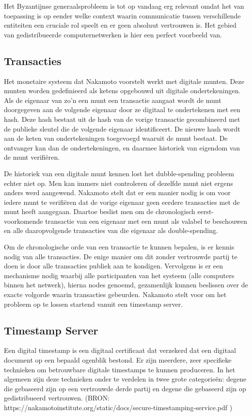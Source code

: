 			Het Byzantijnse generaalsprobleem is tot op vandaag erg relevant omdat het van toepassing is op eender welke context waarin communicatie tussen verschillende entiteiten een cruciale rol speelt en er geen absoluut vertrouwen is. Het gebied van gedistribueerde computernetwerken is hier een perfect voorbeeld van.
			
	\subsection{Transacties}
	Het monetaire systeem dat Nakamoto voorstelt werkt met digitale munten. Deze munten worden gedefinieerd als ketens opgebouwd uit digitale ondertekeningen. Als de eigenaar van zo’n een munt een transactie aangaat wordt de munt doorgegeven aan de volgende eigenaar door ze digitaal te ondertekenen met een hash. Deze hash bestaat uit de hash van de vorige transactie gecombineerd met de publieke sleutel die de volgende eigenaar identificeert. De nieuwe hash wordt aan de keten van ondertekeningen toegevoegd waaruit de munt bestaat. De ontvanger kan dan de ondertekeningen, en daarmee historiek van eigendom van de munt verifiëren. 
			
	De historiek van een digitale munt kennen lost het dubble-spending probleem echter niet op. Men kan immers niet controleren of dezelfde munt niet ergens anders werd aangewend. Nakamoto stelt dat er een manier nodig is om voor iedere munt te verifiëren dat de vorige eigenaar geen eerdere transacties met de munt heeft aangegaan. Daartoe beslist men om de chronologisch eerst-voorkomende transactie van een eigenaar met een munt als valabel te beschouwen en alle daaropvolgende transacties van die eigenaar als double-spending. 
			
	Om de chronologische orde van een transactie te kunnen bepalen, is er kennis nodig van alle transacties. De enige manier om dit zonder vertrouwde partij te doen is door alle transacties publiek aan te kondigen. Vervolgens is er een mechanisme nodig waarbij alle participanten van het systeem (alle computers binnen het netwerk), hierna nodes genoemd, gezamenlijk kunnen beslissen over de exacte volgorde waarin transacties gebeurden. Nakamoto stelt voor om het probleem op te lossen startend vanuit een timestamp server. 
			
	\subsection{Timestamp Server}
	Een digital timestamp is een digitaal certificaat dat verzekerd dat een digitaal document op een bepaald ogenblik bestond. Er zijn meerdere, zeer specifieke technieken om betrouwbare digitale timestamps te kunnen produceren. In het algemeen zijn deze technieken onder te verdelen in twee grote categorieën: degene die gebaseerd zijn op een vertrouwde derde partij en degene die gebaseerd zijn op gedistribueerd vertrouwen. (BRON: https://nakamotoinstitute.org/static/docs/secure-timestamping-service.pdf )
	
